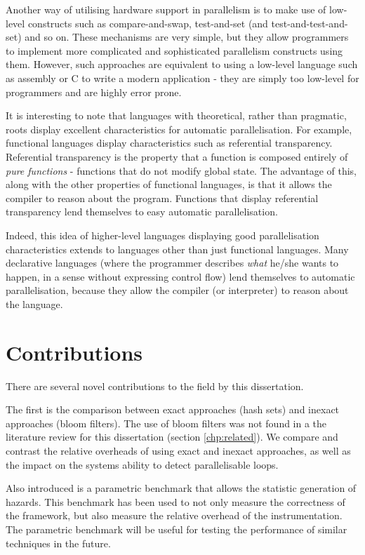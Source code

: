 Another way of utilising hardware support in parallelism is to make use of low-level constructs such as compare-and-swap, test-and-set (and test-and-test-and-set) and so on. These mechanisms are very simple, but they allow programmers to implement more complicated and sophisticated parallelism constructs using them. However, such approaches are equivalent to using a low-level language such as assembly or C to write a modern application - they are simply too low-level for programmers and are highly error prone.

It is interesting to note that languages with theoretical, rather than pragmatic, roots display excellent characteristics for automatic parallelisation. For example, functional languages display characteristics such as referential transparency. Referential transparency is the property that a function is composed entirely of \textit{pure functions} - functions that do not modify global state. The advantage of this, along with the other properties of functional languages, is that it allows the compiler to reason about the program. Functions that display referential transparency lend themselves to easy automatic parallelisation.

Indeed, this idea of higher-level languages displaying good parallelisation characteristics extends to languages other than just functional languages. Many declarative languages (where the programmer describes \emph{what} he/she wants to happen, in a sense without expressing control flow) lend themselves to automatic parallelisation, because they allow the compiler (or interpreter) to reason about the language.

\section{Contributions} \label{sec:introduction/contributions}
There are several novel contributions to the field by this dissertation.

The first is the comparison between exact approaches (hash sets) and inexact approaches (bloom filters). The use of bloom filters was not found in a the literature review for this dissertation (section \ref{chp:related}). We compare and contrast the relative overheads of using exact and inexact approaches, as well as the impact on the systems ability to detect parallelisable loops.

Also introduced is a parametric benchmark that allows the statistic generation of hazards. This benchmark has been used to not only measure the correctness of the framework, but also measure the relative overhead of the instrumentation. The parametric benchmark will be useful for testing the performance of similar techniques in the future.


